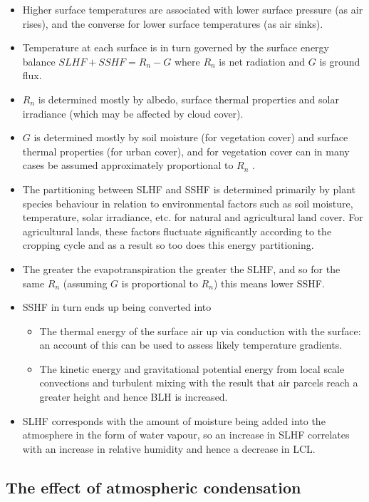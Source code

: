 \begin{itemize}
	\item Higher surface temperatures are associated with lower surface pressure (as air rises), and the converse for lower surface temperatures (as air sinks).
	\item Temperature at each surface is in turn governed by the surface energy balance $SLHF + SSHF = R_n - G$ where $R_n$ is net radiation and $G$ is ground flux.
	\item $R_n$ is determined mostly by albedo, surface thermal properties and solar irradiance (which may be affected by cloud cover).
	\item $G$ is determined mostly by soil moisture (for vegetation cover) and surface thermal properties (for urban cover), and for vegetation cover can in many cases be assumed approximately proportional to $R_n$ \citep{lyons1996}.
	\item The partitioning between \ac{SLHF} and \ac{SSHF} is determined primarily by plant species behaviour in relation to environmental factors such as soil moisture, temperature, solar irradiance, etc. for natural and agricultural land cover. For agricultural lands, these factors fluctuate significantly according to the cropping cycle and as a result so too does this energy partitioning.
	\item The greater the evapotranspiration the greater the \ac{SLHF}, and so for the same $R_n$ (assuming $G$ is proportional to $R_n$) this means lower \ac{SSHF}.
	\item \ac{SSHF} in turn ends up being converted into
	\begin{itemize}
		\item The thermal energy of the surface air up via conduction with the surface: an account of this can be used to assess likely temperature gradients.
		\item The kinetic energy and gravitational potential energy from local scale convections and turbulent mixing with the result that air parcels reach a greater height and hence \ac{BLH} is increased.
	\end{itemize}
	\item \ac{SLHF} corresponds with the amount of moisture being added into the atmosphere in the form of water vapour, so an increase in \ac{SLHF} correlates with an increase in relative humidity and hence a decrease in \ac{LCL}.
\end{itemize}

\subsection{The effect of atmospheric condensation}


